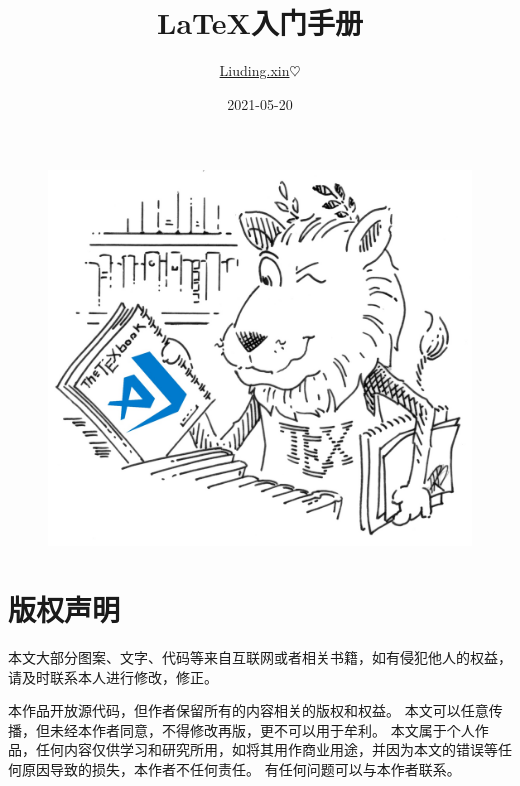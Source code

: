 \documentclass[UTF8,AutoFakeBold]{ctexart}
\numberwithin{figure}{section}
\numberwithin{table}{section}
\begin{document}
\title{ \LaTeX 入门手册}
\author{ \href{http://www.liuding.xin}{Liuding.xin}$\heartsuit$}
\date{2021-05-20}


\begin{titlepage}
    \maketitle %
    \begin{figure}[htbp]
        \centering
        \includegraphics[center, scale=0.4]{images/vscode_latex.jpg}
        \label{cover_pic}
    \end{figure}
\end{titlepage}

\section*{版权声明}

本文大部分图案、文字、代码等来自互联网或者相关书籍，如有侵犯他人的权益，请及时联系本人进行修改，修正。

本作品开放源代码，但作者保留所有的内容相关的版权和权益。 本文可以任意传播，但未经本作者同意，不得修改再版，更不可以用于牟利。 本文属于个人作品，任何内容仅供学习和研究所用，如将其用作商业用途，并因为本文的错误等任何原因导致的损失，本作者不任何责任。 有任何问题可以与本作者联系。
\clearpage
\end{document}
